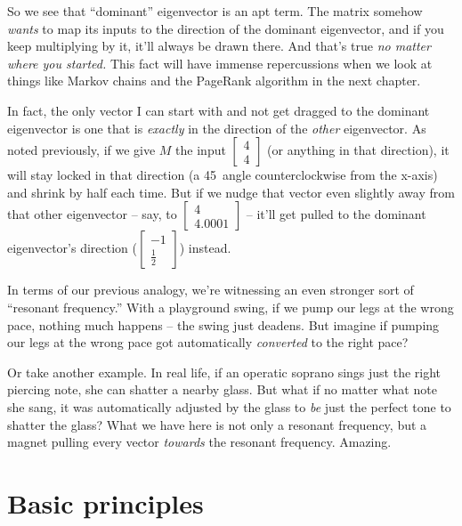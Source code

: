 So we see that ``dominant'' eigenvector is an apt term. The matrix somehow
\textit{wants} to map its inputs to the direction of the dominant eigenvector,
and if you keep multiplying by it, it'll always be drawn there. And that's
true \textit{no matter where you started.} This fact will have immense
repercussions when we look at things like Markov chains and the PageRank
algorithm in the next chapter.

In fact, the only vector I can start with and not get dragged to the dominant
eigenvector is one that is \textit{exactly} in the direction of the
\textit{other} eigenvector. As noted previously, if we give $M$ the input
{\footnotesize $\begin{bmatrix} 4 \\ 4 \end{bmatrix}$} (or anything in that
direction), it will stay locked in that direction (a 45\textdegree~angle
counterclockwise from the x-axis) and shrink by half each time. But if we nudge
that vector even slightly away from that other eigenvector -- say, to
{\scriptsize $\begin{bmatrix} 4 \\ 4.0001 \end{bmatrix}$} -- it'll get pulled
to the dominant eigenvector's direction ({\scriptsize $\begin{bmatrix} -1 \\
\frac{1}{2} \end{bmatrix}$}) instead.

\bigskip

In terms of our previous analogy, we're witnessing an even stronger sort of
``resonant frequency.'' With a playground swing, if we pump our legs at the
wrong pace, nothing much happens -- the swing just deadens. But imagine if
pumping our legs at the wrong pace got automatically \textit{converted} to the
right pace?

Or take another example. In real life, if an operatic soprano sings just the
right piercing note, she can shatter a nearby glass. But what if no matter what
note she sang, it was automatically adjusted by the glass to \textit{be} just
the perfect tone to shatter the glass? What we have here is not only a resonant
frequency, but a magnet pulling every vector \textit{towards} the resonant
frequency. Amazing.

\section{Basic principles}

